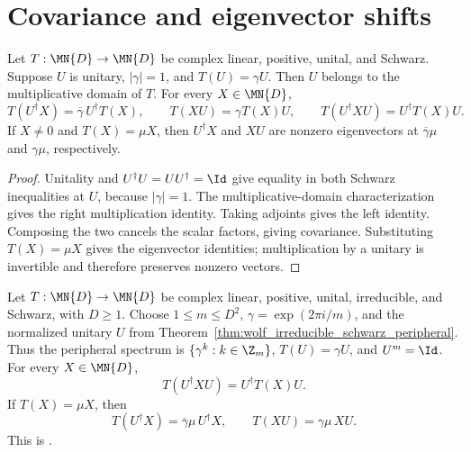 \section{Covariance and eigenvector shifts}

\begin{lemma}
    \label{lem:schwarz_peripheral_unitary_multiplication}
    \leanok
    Let $T:\MN{D}\to\MN{D}$ be complex linear, positive, unital, and
    Schwarz. Suppose $U$ is unitary, $|\gamma|=1$, and $T(U)=\gamma U$.
    Then $U$ belongs to the multiplicative domain of $T$. For every
    $X\in\MN{D}$,
    \[
        T(U^\dagger X)=\overline\gamma\,U^\dagger T(X),
        \qquad T(XU)=\gamma T(X)U,
        \qquad T(U^\dagger XU)=U^\dagger T(X)U.
    \]
    If $X\ne0$ and $T(X)=\mu X$, then $U^\dagger X$ and $XU$ are nonzero
    eigenvectors at $\overline\gamma\mu$ and $\gamma\mu$, respectively.
\end{lemma}

\begin{proof}\leanok
    Unitality and $U^\dagger U=UU^\dagger=\Id$ give equality in both
    Schwarz inequalities at $U$, because $|\gamma|=1$. The
    multiplicative-domain characterization gives the right multiplication
    identity. Taking adjoints gives the left identity. Composing the two
    cancels the scalar factors, giving covariance. Substituting
    $T(X)=\mu X$ gives the eigenvector identities; multiplication by a
    unitary is invertible and therefore preserves nonzero vectors.
\end{proof}

\begin{proposition}
    \label{prop:wolf_schwarz_covariance}
    \leanok
    Let $T:\MN{D}\to\MN{D}$ be complex linear, positive, unital,
    irreducible, and Schwarz, with $D\geq1$. Choose $1\leq m\leq D^2$,
    $\gamma=\exp(2\pi i/m)$, and the normalized unitary $U$ from
    Theorem~\ref{thm:wolf_irreducible_schwarz_peripheral}. Thus the
    peripheral spectrum is $\{\gamma^k:k\in\Z_m\}$, $T(U)=\gamma U$,
    and $U^m=\Id$. For every $X\in\MN{D}$,
    \[
        T(U^\dagger XU)=U^\dagger T(X)U.
    \]
    If $T(X)=\mu X$, then
    \begin{equation}
        T(U^\dagger X)=\overline\gamma\mu\,U^\dagger X,
        \qquad T(XU)=\gamma\mu\,XU.
        \label{eq:wolf_schwarz_eigenvector_shifts}
    \end{equation}
    This is \cite[Proposition~6.7 and Equation~(6.38)]{Wolf2012Quantum}.
\end{proposition}

